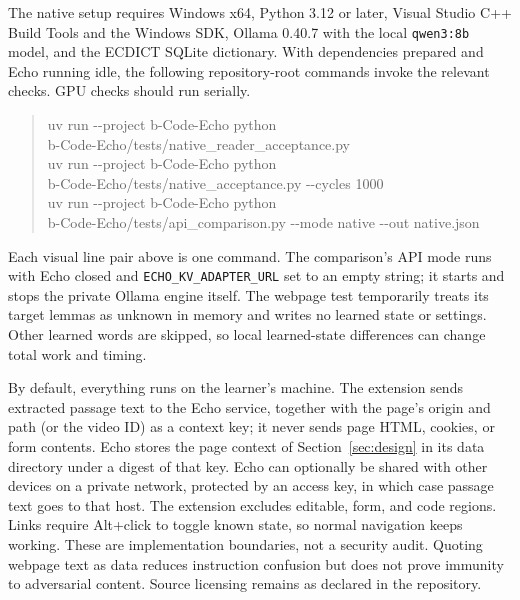 \documentclass[11pt,a4paper]{article}
\newcommand{\code}[1]{\texttt{#1}}
\begin{document}
The native setup requires Windows x64, Python 3.12 or later, Visual Studio C++ Build Tools and the Windows SDK, Ollama 0.40.7 with the local \code{qwen3:8b} model, and the ECDICT SQLite dictionary. With dependencies prepared and Echo running idle, the following repository-root commands invoke the relevant checks. GPU checks should run serially.
\begin{quote}\footnotesize\ttfamily
uv run -{}-project b-Code-Echo python\\
\hspace*{1em}b-Code-Echo/tests/native\_reader\_acceptance.py\\[3pt]
uv run -{}-project b-Code-Echo python\\
\hspace*{1em}b-Code-Echo/tests/native\_acceptance.py -{}-cycles 1000\\[3pt]
uv run -{}-project b-Code-Echo python\\
\hspace*{1em}b-Code-Echo/tests/api\_comparison.py -{}-mode native -{}-out native.json
\end{quote}
Each visual line pair above is one command. The comparison's API mode runs with Echo closed and \code{ECHO\_KV\_ADAPTER\_URL} set to an empty string; it starts and stops the private Ollama engine itself. The webpage test temporarily treats its target lemmas as unknown in memory and writes no learned state or settings. Other learned words are skipped, so local learned-state differences can change total work and timing.

By default, everything runs on the learner's machine. The extension sends extracted passage text to the Echo service, together with the page's origin and path (or the video ID) as a context key; it never sends page HTML, cookies, or form contents. Echo stores the page context of Section~\ref{sec:design} in its data directory under a digest of that key. Echo can optionally be shared with other devices on a private network, protected by an access key, in which case passage text goes to that host. The extension excludes editable, form, and code regions. Links require Alt+click to toggle known state, so normal navigation keeps working. These are implementation boundaries, not a security audit. Quoting webpage text as data reduces instruction confusion but does not prove immunity to adversarial content. Source licensing remains as declared in the repository.
\end{document}
